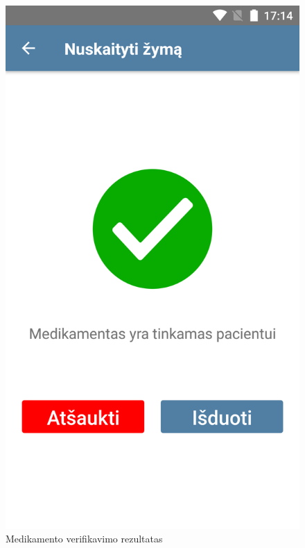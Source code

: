 \documentclass{VUMIFPSbakalaurinis}
\begin{document}
\begin{figure}[H]
    \centering
    \includegraphics[scale=0.15]{images/prototype-4}
    \caption{Medikamento verifikavimo rezultatas} 
\end{figure}
\end{document}
